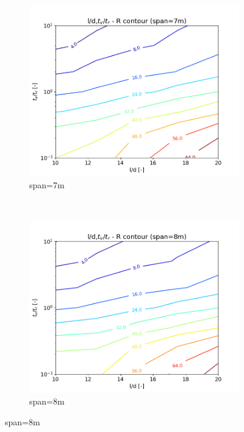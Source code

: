 \begin{figure}
\begin{subfigure}[b]{.49\textwidth}
  \centering
  \includegraphics[width=.99\linewidth]{images/l2d,gamma_R_7m.png}
  \caption{span=7m}
\end{subfigure}
~
\begin{subfigure}[b]{.49\textwidth}
  \centering
  \includegraphics[width=.99\linewidth]{images/l2d,gamma_R_8m.png}
  \caption{span=8m}
\end{subfigure}


\end{figure}
